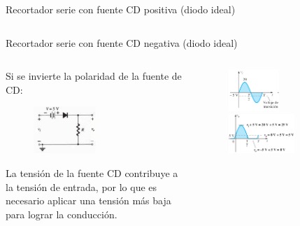 \documentclass[t,aspectratio=169]{beamer}
\begin{document}
\begin{frame}{Recortador serie con fuente CD positiva (diodo ideal)}
\begin{columns}
\begin{column}{0.5\textwidth}
\end{column}
\end{columns}

\end{frame}


\begin{frame}{Recortador serie con fuente CD negativa (diodo ideal)}

\begin{columns}
\begin{column}{0.5\textwidth}

Si se invierte la polaridad de la fuente de CD:

\begin{figure}
    \centering
    \includegraphics[width=0.5\textwidth]{figures/recortador_serie_ideal_fuente_neg_circuito.png}
\end{figure}

La tensión de la fuente CD contribuye a la tensión de entrada, por lo que es necesario aplicar una tensión más baja para lograr la conducción.

\end{column}
\begin{column}{0.5\textwidth}

\begin{figure}
    \flushleft
    \includegraphics[width=0.5\textwidth]{figures/recortador_serie_ideal_fuente_neg_1.png}
    \includegraphics[width=0.65\textwidth]{figures/recortador_serie_ideal_fuente_neg_2.png}
\end{figure}


\end{column}
\end{columns}
\end{frame}
\end{document}
